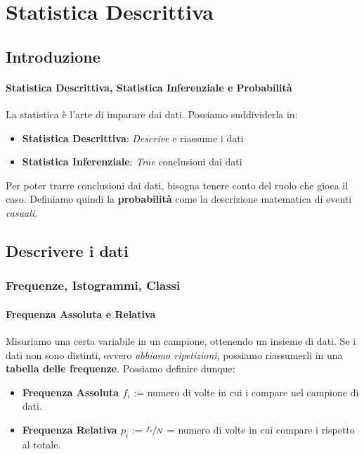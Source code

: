 \renewcommand{\labelitemi}{\textsc{\labelitemiv}}

\chapter[Statistica Descrittiva]{Statistica Descrittiva}

\section{Introduzione}

\subsubsection{Statistica Descrittiva, Statistica Inferenziale e Probabilità}

La statistica è l'arte di imparare dai dati. Possiamo suddividerla in:
\begin{itemize}
    \item \textbf{Statistica Descrittiva}: \textit{Descrive} e riassume i dati
    \item \textbf{Statistica Inferenziale}: \textit{Trae} conclusioni dai dati
\end{itemize}
Per poter trarre conclusioni dai dati, bisogna tenere conto del ruolo che gioca il caso. Definiamo quindi la \textbf{probabilità} come la descrizione matematica di eventi \textit{casuali}.

\section{Descrivere i dati}

\subsection{Frequenze, Istogrammi, Classi}

\subsubsection{Frequenza Assoluta e Relativa}

Misuriamo una certa variabile in un campione, ottenendo un insieme di dati. Se i dati non sono distinti, ovvero \textit{abbiamo ripetizioni}, possiamo riassumerli in una \textbf{tabella delle frequenze}. Possiamo definire dunque:

\begin{itemize}
    \item \textbf{Frequenza Assoluta $f_i$ }:= numero di volte in cui i compare nel campione di dati.
    \item \textbf{Frequenza Relativa $p_i$ }:= $\sfrac{f_i}{N}$ = numero di volte in cui compare i rispetto al totale.  
\end{itemize}


